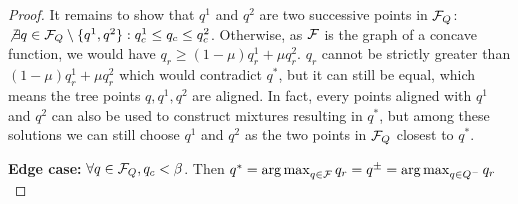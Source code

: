 \begin{subappendices}
\begin{proof}
	It remains to show that $q^1$ and $q^2$ are two successive points in $\mathcal{F}_Q$: $\not\exists q\in\mathcal{F}_Q\setminus\{q^1, q^2\}: q^1_c \leq q_c \leq q^2_c$. Otherwise, as $\mathcal{F}$ is the graph of a concave function, we would have $q_r \geq (1-\mu)q_r^1 + \mu q_r^2$. $q_r$ cannot be strictly greater than $(1-\mu)q_r^1 + \mu q_r^2$ which would contradict $q^*$, but it can still be equal, which means the tree points $q, q^1, q^2$ are aligned. In fact, every points aligned with $q^1$ and $q^2$ can also be used to construct mixtures resulting in $q^*$, but among these solutions we can still choose $q^1$ and $q^2$ as the two points in $\mathcal{F}_Q$ closest to $q^*$.
	
	\textbf{Edge case:} $\forall q\in\mathcal{F}_Q, q_c < \beta$. Then  $q^* =  \operatorname*{arg\,max}_{q\in\mathcal{F}} q_r = q^\pm =  \operatorname*{arg\,max}_{q\in Q^-} q_r$
	
\end{proof}








\end{subappendices}
